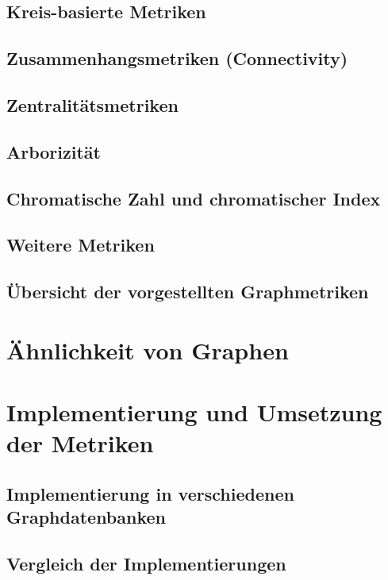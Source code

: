 \documentclass[a4paper,12pt,ngerman,chapterprefix=false,listof=totoc,bibliography=totoc]{scrreprt}
\begin{document}
\section{Kreis-basierte Metriken}

\section{Zusammenhangsmetriken (Connectivity)}

\section{Zentralitätsmetriken}

\section{Arborizität}

\section{Chromatische Zahl und chromatischer Index}

\section{Weitere Metriken}

\section{Übersicht der vorgestellten Graphmetriken}

\chapter{Ähnlichkeit von Graphen}

\chapter{Implementierung und Umsetzung der Metriken}

\section{Implementierung in verschiedenen Graphdatenbanken}

\section{Vergleich der Implementierungen}
\end{document}
